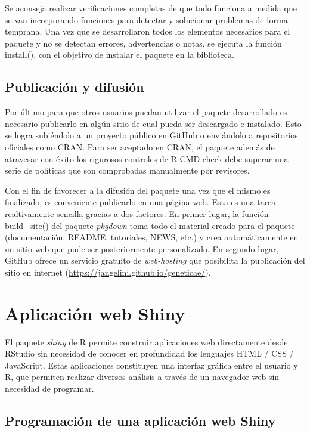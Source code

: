 Se aconseja realizar verificaciones completas de que todo funciona a medida que se van incorporando funciones para detectar y solucionar problemas de forma temprana. Una vez que se desarrollaron todos los elementos necesarios para el paquete y no se detectan errores, advertencias o notas, se ejecuta la función \textcolor{fandango}{install()}, con el objetivo de instalar el paquete en la biblioteca.


\subsection{Publicación y difusión}

Por último para que otros usuarios puedan utilizar el paquete desarrollado es necesario publicarlo en algún sitio de cual pueda ser descargado e instalado. Esto se logra subiéndolo a un proyecto público en GitHub o enviándolo a repositorios oficiales como CRAN. Para ser aceptado en CRAN, el paquete además de atravesar con éxito los rigurosos controles de R CMD check debe superar una serie de políticas que son comprobadas manualmente por revisores. 

Con el fin de favorecer a la difusión del paquete una vez que el mismo es finalizado, es conveniente publicarlo en una página web. Esta es una tarea realtivamente sencilla gracias a dos factores. En primer lugar, la función \textcolor{fandango}{build\_site()} del paquete \emph{pkgdown} \citep{HadleyHesselberth2020} toma todo el material creado para el paquete (documentación, README, tutoriales, NEWS, etc.) y crea automáticamente en un sitio web que pude ser posteriormente personalizado. En segundo lugar, GitHub ofrece un servicio gratuito de \emph{web-hosting} que posibilita la publicación del sitio en internet (\url{https://jangelini.github.io/geneticae/}).

\section{Aplicación web Shiny}

El paquete \emph{shiny} \citep{Changetal2020} de R permite construir aplicaciones web directamente desde RStudio sin necesidad de conocer en profundidad los lenguajes HTML / CSS / JavaScript. Estas aplicaciones constituyen una interfaz gráfica entre el usuario y R, que permiten realizar diversos análisis a través de un navegador web sin necesidad de programar.


\subsection{Programación de una aplicación web Shiny}


